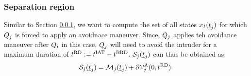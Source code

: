 \subsubsection{Separation region} \label{sec:sepRegion_case2}
Similar to Section \ref{sec:sepRegion_case2}, we want to compute the set of all states $x_{I}(\underline{t}_j)$ for which $Q_j$ is forced to apply an avoidnace maneuver. Since, $Q_j$ applies teh avoidance maneuver after $Q_i$ in this case, $Q_j$ will need to avoid the intruder for a maximum duration of $t^\text{RD} := t^\text{IAT} - t^\text{BRD}$. $\mathcal{S}_j(\underline{t}_j)$ can thus be obtained as:
\begin{equation} \label{eqn:sepRegion_case2}
\sep_j(\tsa_j) = \boset_j(\tsa_j) + \partial \brs^{\text{A}}_{j}(0, \trd).
\end{equation}